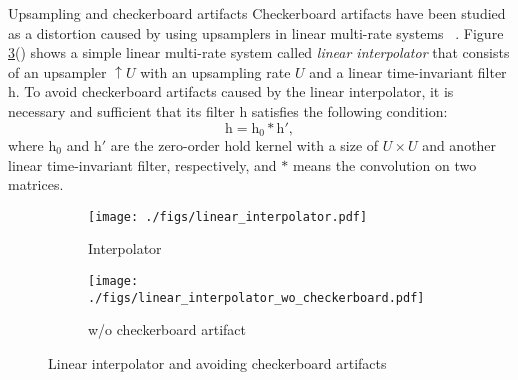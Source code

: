 \documentclass{article}
\makeatletter
\renewcommand\subsection{\@startsection{subsection}{2}{\z@}
                      {0.5ex \@plus 0ex \@minus -2ex}
                      {0.5ex \@plus 0ex}
                      {\normalfont\large\bfseries}}
\newcommand{\mymatrix}[1]{\mathrm{#1}}
\makeatother
\begin{document}
\subsection{Upsampling and checkerboard artifacts\label{sec:checkerboard}}
  Checkerboard artifacts have been studied as a distortion
  caused by using upsamplers in linear multi-rate systems
  ~\cite{harada1998multidimensional, tamura1998design, harada1998multidimensional_trans,
  iwai2010methods}.
  Figure \ref{fig:linear}() shows
  a simple linear multi-rate system called \textit{linear interpolator}
  that consists of an upsampler $\uparrow U$ with an upsampling rate $U$
  and a linear time-invariant filter $\mymatrix{h}$.
  To avoid checkerboard artifacts caused by the linear interpolator,
  it is necessary and sufficient that its filter $\mymatrix{h}$
  satisfies the following condition:
  \begin{equation}
    \mymatrix{h} = \mymatrix{h}_0 * \mymatrix{h}',
    \label{eq:general_condition}
  \end{equation}
  where $\mymatrix{h}_0$ and $\mymatrix{h}'$ are the zero-order hold kernel
  with a size of $U \times U$
  and another linear time-invariant filter, respectively,
  and $*$ means the convolution on two matrices.
\begin{figure}[!t]
  \centering
  \begin{subfigure}[t]{0.45\hsize}
    \centering
    \texttt{[image: ./figs/linear\_interpolator.pdf]}
    \caption{Interpolator \label{fig:lin_interpolator}}
  \end{subfigure}
  \begin{subfigure}[t]{0.45\hsize}
    \centering
    \texttt{[image: ./figs/linear\_interpolator\_wo\_checkerboard.pdf]}
    \caption{w/o checkerboard artifact \label{fig:lin_wo_checkerboard}}
  \end{subfigure}
  \vspace{-2ex}
  \caption{Linear interpolator and avoiding checkerboard artifacts \label{fig:linear}}
\end{figure}
\end{document}
